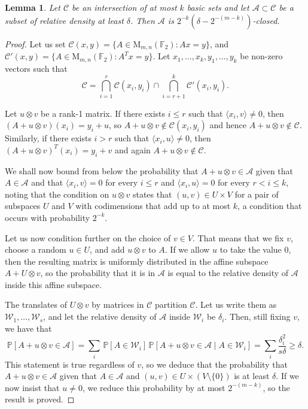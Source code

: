 \documentclass[11pt]{article}
\numberwithin{equation}{section}
\newtheorem{lemma}[theorem]{Lemma}
\theoremstyle{definition}
\theoremstyle{plain}
\renewcommand\P{\mathbb{P}}
\newcommand\F{\mathbb{F}}
\renewcommand\d{\delta}
\newcommand \cA{\mathcal A}
\newcommand \cC{\mathcal C}
\newcommand \cW{\mathcal W}
\newcommand \mn{\mathrm{M}_{m,n}(\F_2)}
\begin{document}
\begin{lemma}
	Let $\cC$ be an intersection of at most $k$ basic sets and let $\cA\subset\cC$ be a subset of relative density at least $\d$. Then $\cA$ is $2^{-k}(\d-2^{-(m-k)})$-closed.
\end{lemma}

\begin{proof}
  Let us set $\cC(x,y)=\{A\in\mn:Ax=y\}$, and $\cC'(x,y)=\{A\in\mn:A^Tx=y\}$. Let $x_1,\dots,x_k,y_1,\dots,y_k$ be non-zero vectors such that
  \[
    \cC=\bigcap_{i=1}^r\cC(x_i,y_i)\cap\bigcap_{i=r+1}^k\cC'(x_i,y_i).
  \]

  Let $u\otimes v$ be a rank-1 matrix. If there exists $i\leq r$ such that $\langle x_i,v\rangle\ne 0$, then $(A+u\otimes v)(x_i)=y_i+u$, so $A+u\otimes v\notin\cC(x_i,y_i)$ and hence $A+u\otimes v\notin\cC$. Similarly, if there exists $i>r$ such that $\langle x_i,u\rangle\ne 0$, then $(A+u\otimes v)^T(x_i)=y_i+v$ and again $A+u\otimes v\notin\cC$. 
	
	We shall now bound from below the probability that $A+u\otimes v\in\cA$ given that $A\in\cA$ and that $\langle x_i,v\rangle=0$ for every $i\leq r$ and $\langle x_i,u\rangle=0$ for every $r<i\leq k$, noting that the condition on $u\otimes v$ states that $(u,v)\in U\times V$ for a pair of subspaces $U$ and $V$ with codimensions that add up to at most $k$, a condition that occurs with probability $2^{-k}$.
	
	Let us now condition further on the choice of $v\in V$. That means that we fix $v$, choose a random $u\in U$, and add $u\otimes v$ to $A$. If we allow $u$ to take the value 0, then the resulting matrix is uniformly distributed in the affine subspace $A+U\otimes v$, so the probability that it is in $\cA$ is equal to the relative density of $\cA$ inside this affine subspace.
	
	The translates of $U\otimes v$ by matrices in $\cC$ partition $\cC$. Let us write them as $\cW_1,\dots,\cW_s$, and let the relative density of $\cA$ inside $\cW_i$ be $\d_i$. Then, still fixing $v$, we have that
	\[\P[A+u\otimes v\in\cA]=\sum_i\,\P[A\in\cW_i]\,\P[A+u\otimes v\in\cA \mid A\in\cW_i]=\sum_i \frac{\d_i^2}{s\delta}\geq\d.\]
	This statement is true regardless of $v$, so we deduce that the probability that $A+u\otimes v\in\cA$ given that $A\in\cA$ and $(u,v)\in U\times(V\setminus\{0\})$ is at least $\d$. If we now insist that $u\ne 0$, we reduce this probability by at most $2^{-(m-k)}$, so the result is proved.
\end{proof}
\end{document}
